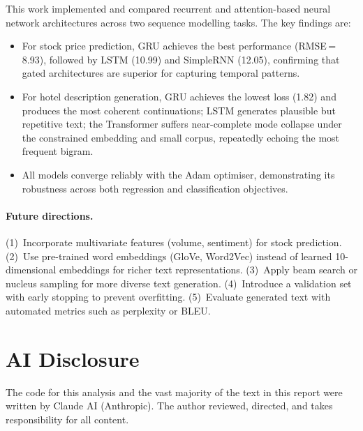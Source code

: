\documentclass[11pt,letterpaper]{article}
\begin{document}
This work implemented and compared recurrent and attention-based neural network
architectures across two sequence modelling tasks.
The key findings are:

\begin{itemize}[noitemsep]
  \item For stock price prediction, GRU achieves the best performance
        (RMSE\,=\,8.93), followed by LSTM (10.99) and SimpleRNN (12.05),
        confirming that gated architectures are superior for capturing temporal
        patterns.
  \item For hotel description generation, GRU achieves the lowest loss (1.82)
        and produces the most coherent continuations; LSTM generates plausible
        but repetitive text; the Transformer suffers near-complete mode collapse
        under the constrained embedding and small corpus, repeatedly echoing the
        most frequent bigram.
  \item All models converge reliably with the Adam optimiser, demonstrating its
        robustness across both regression and classification objectives.
\end{itemize}

\paragraph{Future directions.}
(1)~Incorporate multivariate features (volume, sentiment) for stock prediction.
(2)~Use pre-trained word embeddings (GloVe, Word2Vec) instead of learned
10-dimensional embeddings for richer text representations.
(3)~Apply beam search or nucleus sampling for more diverse text generation.
(4)~Introduce a validation set with early stopping to prevent overfitting.
(5)~Evaluate generated text with automated metrics such as perplexity or BLEU.

\section*{AI Disclosure}

The code for this analysis and the vast majority of the text in this report were
written by Claude AI (Anthropic). The author reviewed, directed, and takes
responsibility for all content.
\end{document}
